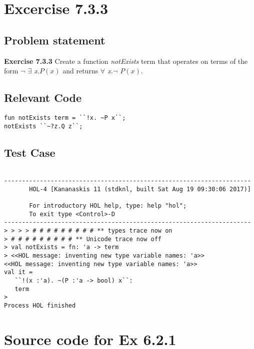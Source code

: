 \documentclass{report}
\begin{document}
\chapter{Excercise 7.3.3}
\label{ex-7-3-3}

\section{Problem statement}
\label{problem-statement-7-3-3}
\textbf{Exercise 7.3.3} Create a function \emph{notExists} term that operates on terms of the form \emph{$\neg$ $\exists$ x.$P(x)$} and returns \emph{$\forall$ x.$\neg$ $P(x)$}.

\section{Relevant Code}
\label{rel-code-7-3-3}
\begin{lstlisting}[frame=TBlr]
fun notExists term = ``!x. ~P x``;
notExists ``~?z.Q z``;
\end{lstlisting}

\section{Test Case}
\label{test-results-7-3-3}

\begin{session}
  \begin{scriptsize}
\begin{verbatim}

---------------------------------------------------------------------
       HOL-4 [Kananaskis 11 (stdknl, built Sat Aug 19 09:30:06 2017)]

       For introductory HOL help, type: help "hol";
       To exit type <Control>-D
---------------------------------------------------------------------
> > > > # # # # # # # # # ** types trace now on
> # # # # # # # # # ** Unicode trace now off
> val notExists = fn: 'a -> term
> <<HOL message: inventing new type variable names: 'a>>
<<HOL message: inventing new type variable names: 'a>>
val it =
   ``!(x :'a). ~(P :'a -> bool) x``:
   term
> 
Process HOL finished

\end{verbatim}
  \end{scriptsize}
\end{session}


\appendix{}

\chapter{Source code for Ex 6.2.1}
\label{cha:source-code-6-2-1}
\end{document}
